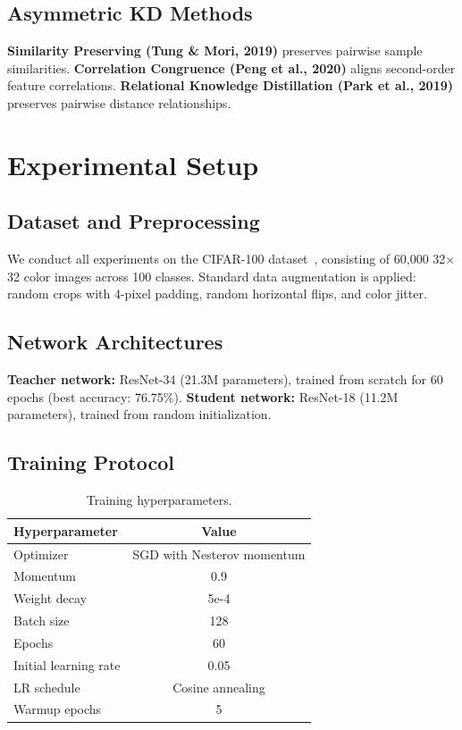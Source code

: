 \documentclass[symmetry,article,submit,moreauthors]{Definitions/mdpi}
\begin{document}
\subsection{Asymmetric KD Methods}

\textbf{Similarity Preserving (Tung \& Mori, 2019)} preserves pairwise sample similarities. \textbf{Correlation Congruence (Peng et al., 2020)} aligns second-order feature correlations. \textbf{Relational Knowledge Distillation (Park et al., 2019)} preserves pairwise distance relationships.

\section{Experimental Setup}

\subsection{Dataset and Preprocessing}

We conduct all experiments on the CIFAR-100 dataset~\cite{ref19}, consisting of 60,000 32$\times$32 color images across 100 classes. Standard data augmentation is applied: random crops with 4-pixel padding, random horizontal flips, and color jitter.

\subsection{Network Architectures}

\textbf{Teacher network:} ResNet-34 (21.3M parameters), trained from scratch for 60 epochs (best accuracy: 76.75\%). \textbf{Student network:} ResNet-18 (11.2M parameters), trained from random initialization.

\subsection{Training Protocol}

\begin{table}[H]
\caption{Training hyperparameters.\label{tab:hyperparams}}
\begin{tabularx}{\textwidth}{lC}
\toprule
\textbf{Hyperparameter} & \textbf{Value}\\
\midrule
Optimizer & SGD with Nesterov momentum\\
Momentum & 0.9\\
Weight decay & 5e-4\\
Batch size & 128\\
Epochs & 60\\
Initial learning rate & 0.05\\
LR schedule & Cosine annealing\\
Warmup epochs & 5\\
\bottomrule
\end{tabularx}
\end{table}
\end{document}
